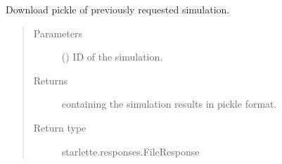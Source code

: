 \documentclass[a4paper,landscape,10pt,english]{sphinxmanual}
\begin{document}
\begin{fulllineitems}
\label{\detokenize{code_docs/simulation_api.controller:simulation_api.controller.main.api_results_sim_id_pickle}}
Download pickle of previously requested simulation.
\begin{quote}\begin{description}
\item[{Parameters}] \leavevmode
{} () \textendash{} ID of the simulation.

\item[{Returns}] \leavevmode
{} containing the simulation results
in pickle format.

\item[{Return type}] \leavevmode
starlette.responses.FileResponse

\end{description}\end{quote}

\end{fulllineitems}

\end{document}
